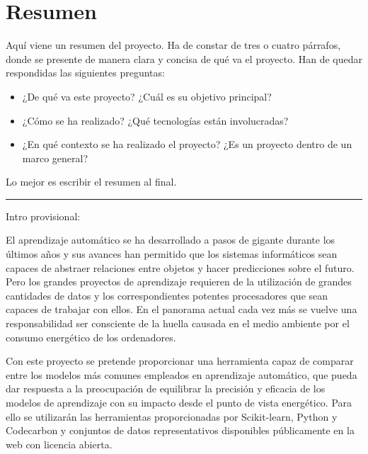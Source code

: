 \documentclass[a4paper, 12pt, oneside]{book}
\begin{document}



\chapter*{Resumen}
\thispagestyle{empty}

Aquí viene un resumen del proyecto.
Ha de constar de tres o cuatro párrafos, donde se presente de manera clara y concisa de qué va el proyecto. 
Han de quedar respondidas las siguientes preguntas:

\begin{itemize}
  \item ¿De qué va este proyecto? ¿Cuál es su objetivo principal?
  \item ¿Cómo se ha realizado? ¿Qué tecnologías están involucradas?
  \item ¿En qué contexto se ha realizado el proyecto? ¿Es un proyecto dentro de un marco general?
\end{itemize}

Lo mejor es escribir el resumen al final.
\\\noindent\rule{\textwidth}{0.4pt}
Intro provisional:

El aprendizaje automático se ha desarrollado a pasos de gigante durante los últimos años y sus avances han permitido que los sistemas informáticos sean capaces de abstraer relaciones entre objetos y hacer predicciones sobre el futuro. Pero los grandes proyectos de aprendizaje requieren de la utilización de grandes cantidades de datos y los correspondientes potentes procesadores que sean capaces de trabajar con ellos. En el panorama actual cada vez más se vuelve una responsabilidad ser consciente de la huella causada en el medio ambiente por el consumo energético de los ordenadores.

Con este proyecto se pretende proporcionar una herramienta capaz de comparar entre los modelos más comunes empleados en aprendizaje automático, que pueda dar respuesta a la preocupación de equilibrar la precisión y eficacia de los modelos de aprendizaje con su impacto desde el punto de vista energético. Para ello se utilizarán las herramientas proporcionadas por Scikit-learn, Python y Codecarbon y conjuntos de datos representativos disponibles públicamente en la web con licencia abierta.
\end{document}
